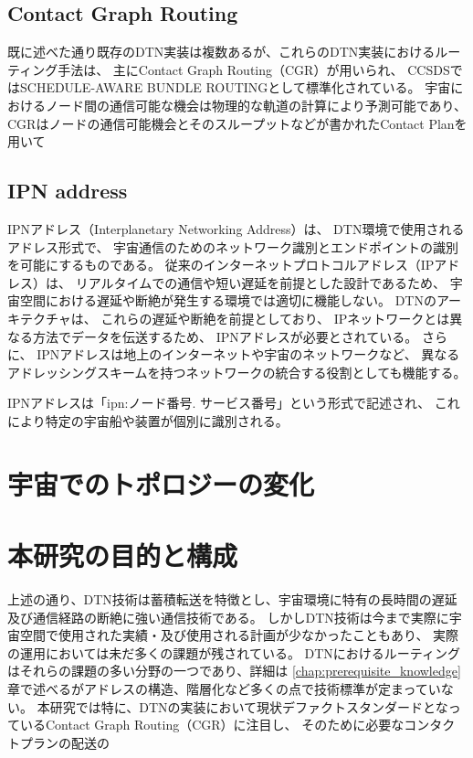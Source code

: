 \subsection{Contact Graph Routing}
既に述べた通り既存のDTN実装は複数あるが、これらのDTN実装におけるルーティング手法は、
主にContact Graph Routing（CGR）が用いられ、 
CCSDSではSCHEDULE-AWARE BUNDLE ROUTINGとして標準化されている。 
宇宙におけるノード間の通信可能な機会は物理的な軌道の計算により予測可能であり、 
CGRはノードの通信可能機会とそのスループットなどが書かれたContact Planを用いて
\subsection{IPN address}
IPNアドレス（Interplanetary Networking Address）は、 DTN環境で使用されるアドレス形式で、
宇宙通信のためのネットワーク識別とエンドポイントの識別を可能にするものである。 従来のインターネットプロトコルアドレス（IPアドレス）は、
リアルタイムでの通信や短い遅延を前提とした設計であるため、 宇宙空間における遅延や断絶が発生する環境では適切に機能しない。
DTNのアーキテクチャは、 これらの遅延や断絶を前提としており、 IPネットワークとは異なる方法でデータを伝送するため、
IPNアドレスが必要とされている。 さらに、 IPNアドレスは地上のインターネットや宇宙のネットワークなど、
異なるアドレッシングスキームを持つネットワークの統合する役割としても機能する。

IPNアドレスは「ipn:ノード番号. サービス番号」という形式で記述され、 これにより特定の宇宙船や装置が個別に識別される。 

\section{宇宙でのトポロジーの変化}

\section{本研究の目的と構成}
上述の通り、DTN技術は蓄積転送を特徴とし、宇宙環境に特有の長時間の遅延及び通信経路の断絶に強い通信技術である。
しかしDTN技術は今まで実際に宇宙空間で使用された実績・及び使用される計画が少なかったこともあり、
実際の運用においては未だ多くの課題が残されている。
DTNにおけるルーティングはそれらの課題の多い分野の一つであり、詳細は
\ref{chap:prerequisite_knowledge}章で述べるがアドレスの構造、階層化など多くの点で技術標準が定まっていない。
本研究では特に、DTNの実装において現状デファクトスタンダードとなっているContact Graph Routing（CGR）に注目し、
そのために必要なコンタクトプランの配送の